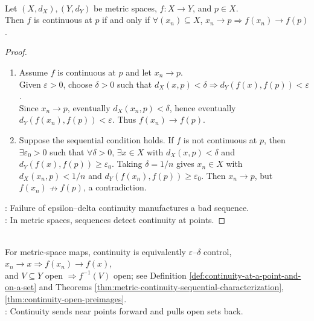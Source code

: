 \begin{theorem} \label{thm:metric-continuity-sequential-characterization} \\
Let $(X,d_X),(Y,d_Y)$ be metric spaces, $f:X\to Y$, and $p\in X$.\\
Then $f$ is continuous at $p$ if and only if $\forall(x_n)\subseteq X$, $x_n\to p\Longrightarrow f(x_n)\to f(p)$.
\begin{proof}
\begin{enumerate}[label=\roman*.]
\setlength{\itemsep}{0pt}
\item[$(\Rightarrow)$] Assume $f$ is continuous at $p$ and let $x_n\to p$.\\
Given $\varepsilon>0$, choose $\delta>0$ such that $d_X(x,p)<\delta\Longrightarrow d_Y(f(x),f(p))<\varepsilon$.\\
Since $x_n\to p$, eventually $d_X(x_n,p)<\delta$, hence eventually $d_Y(f(x_n),f(p))<\varepsilon$. Thus $f(x_n)\to f(p)$.
\item[$(\Leftarrow)$] Suppose the sequential condition holds. If $f$ is not continuous at $p$, then $\exists\varepsilon_0>0$ such that $\forall\delta>0$, $\exists x\in X$ with $d_X(x,p)<\delta$ and $d_Y(f(x),f(p))\geq\varepsilon_0$. Taking $\delta=1/n$ gives $x_n\in X$ with $d_X(x_n,p)<1/n$ and $d_Y(f(x_n),f(p))\geq\varepsilon_0$. Then $x_n\to p$, but $f(x_n)\nrightarrow f(p)$, a contradiction.
\end{enumerate}
: Failure of epsilon--delta continuity manufactures a bad sequence.\\
: In metric spaces, sequences detect continuity at points.
\end{proof}
\end{theorem}

\begin{perspective} \label{per:three-views-of-continuity} \\
For metric-space maps, continuity is equivalently $\varepsilon$--$\delta$ control, $x_n\to x\Rightarrow f(x_n)\to f(x)$,\\
and $V\subseteq Y$ open $\Rightarrow f^{-1}(V)$ open; see Definition \ref{def:continuity-at-a-point-and-on-a-set} and Theorems \ref{thm:metric-continuity-sequential-characterization}, \ref{thm:continuity-open-preimages}.\\
: Continuity sends near points forward and pulls open sets back.
\end{perspective}

